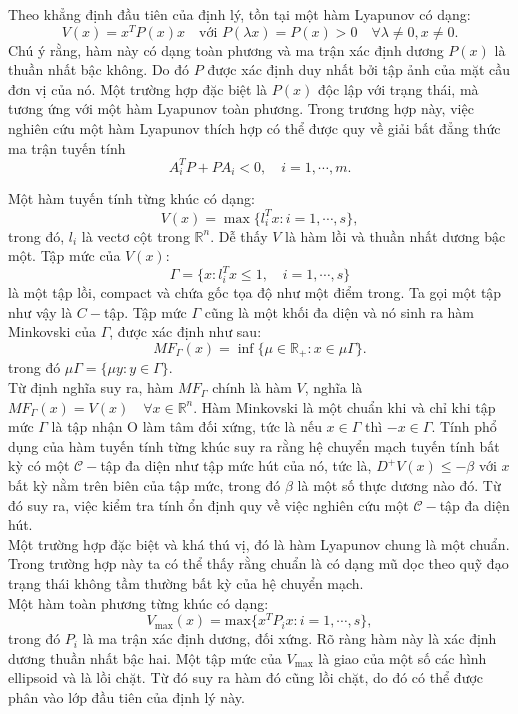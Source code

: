 \documentclass[14pt,a4paper,oneside]{report}		%
\theoremstyle{definition}
\begin{document}
Theo khẳng định đầu tiên của định lý, tồn tại một hàm Lyapunov có dạng:
$$V(x)=x^TP(x)x\quad\text{với }P(\lambda x)=P(x)>0\quad\forall\lambda\neq
 0,x\neq 0.$$
Chú ý rằng, hàm này có dạng toàn phương và ma trận xác định dương $P(x)$ là thuần nhất bậc không. Do đó $P$ được xác định duy nhất bởi tập ảnh của mặt cầu đơn vị của nó. Một trường hợp đặc biệt là $P(x)$ độc lập với trạng thái, mà tương ứng với một hàm Lyapunov toàn phương. Trong trương hợp này, việc nghiên cứu một hàm Lyapunov thích hợp có thể được quy về giải bất đẳng thức ma trận tuyến tính
$$A_i^TP+PA_i<0,\quad i=1,\cdots,m.$$

Một hàm tuyến tính từng khúc có dạng:
$$V(x)=\max\{l_i^Tx:i=1,\cdots,s\},$$
trong đó, $l_i$ là vectơ cột trong $\mathbb{R}^n$. Dễ thấy $V$ là hàm lồi và thuần nhất dương bậc một. Tập mức của $V(x)$:
$$\Gamma = \{x:l_i^Tx\leq1,\quad i=1,\cdots,s\}$$
là một tập lồi, compact và chứa gốc tọa độ như một điểm trong. Ta gọi một tập như vậy là $C-$tập. Tập mức $\Gamma$ cũng là một khối đa diện và nó sinh ra hàm Minkovski của $\Gamma$, được xác định như sau:
$$MF_\Gamma(x)=\inf\{\mu\in\mathbb{R}_+:x\in\mu\Gamma\}.$$
trong đó $\mu\Gamma = \{\mu y:y\in\Gamma\}.$\\

Từ định nghĩa suy ra, hàm $MF_\Gamma$ chính là hàm $V$, nghĩa là $MF_\Gamma(x)=V(x)\quad \forall x\in\mathbb{R}^n$. Hàm Minkovski là một chuẩn khi và chỉ khi tập mức $\Gamma$ là tập nhận O làm tâm đối xứng, tức là nếu $x\in\Gamma$ thì $-x\in\Gamma$. Tính phổ dụng của hàm tuyến tính từng khúc suy ra rằng hệ chuyển mạch tuyến tính bất kỳ có một $\mathcal{C}-$tập đa diện như tập mức hút của nó, tức là, $D^+V(x)\leq -\beta$ với $x$ bất kỳ nằm trên biên của tập mức, trong đó $\beta$ là một số thực dương nào đó. Từ đó suy ra, việc kiểm tra tính ổn định quy về việc nghiên cứu một $\mathcal{C}-$tập đa diện hút.\\

Một trường hợp đặc biệt và khá thú vị, đó là hàm Lyapunov chung là một chuẩn. Trong trường hợp này ta có thể thấy rằng chuẩn là có dạng mũ dọc theo quỹ đạo trạng thái không tầm thường bất kỳ của hệ chuyển mạch.\\

Một hàm toàn phương từng khúc có dạng:
$$V_{\text{max}} (x)=\text{max}\{x^TP_ix:i=1,\cdots,s\},$$
trong đó $P_i$ là ma trận xác định dương, đối xứng. Rõ ràng hàm này là xác định dương thuần nhất bậc hai. Một tập mức của $V_\text{max}$ là giao của một số các hình ellipsoid và là lồi chặt. Từ đó suy ra hàm đó cũng lồi chặt, do đó có thể được phân vào lớp đầu tiên của định lý này.\\
\end{document}

